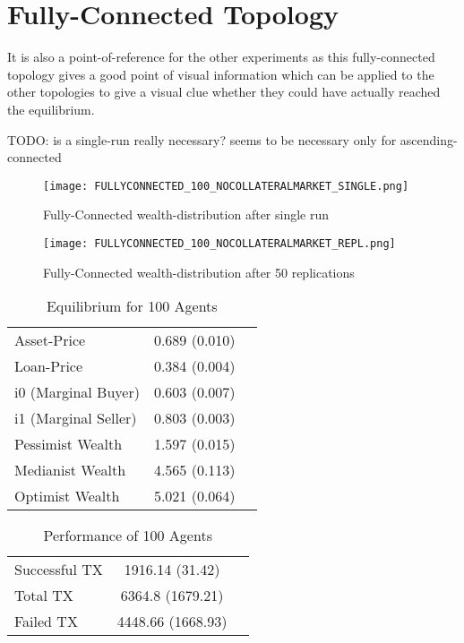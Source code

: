 \documentclass[Bachelorarbeit.tex]{subfiles}
\begin{document}
\section{Fully-Connected Topology}
It is also a point-of-reference for the other experiments as this fully-connected topology gives a good point of visual information which can be applied to the other topologies to give a visual clue whether they could have actually reached the equilibrium.

TODO: is a single-run really necessary? seems to be necessary only for ascending-connected 

\begin{figure}[!htbp]
	\centering
  \texttt{[image: FULLYCONNECTED\_100\_NOCOLLATERALMARKET\_SINGLE.png]}
	\caption{Fully-Connected wealth-distribution after single run}
	\label{fig1}
\end{figure}

\begin{figure}[!htbp]
	\centering
  \texttt{[image: FULLYCONNECTED\_100\_NOCOLLATERALMARKET\_REPL.png]}
	\caption{Fully-Connected wealth-distribution after 50 replications}
	\label{fig1}
\end{figure}

\begin{table}[h]
	\caption{Equilibrium for 100 Agents}
	\centering
	\begin{tabular} { l c r }
		\hline
		Asset-Price & 0.689 (0.010) \\
		Loan-Price & 0.384 (0.004) \\
		i0 (Marginal Buyer) & 0.603 (0.007) \\
		i1 (Marginal Seller) & 0.803 (0.003) \\
		Pessimist Wealth & 1.597 (0.015) \\
		Medianist Wealth & 4.565 (0.113) \\
		Optimist Wealth & 5.021 (0.064) \\
		\hline
	\end{tabular}
\end{table} 

\begin{table}[h]
	\caption{Performance of 100 Agents}
	\centering
	\begin{tabular} { l c r }
		\hline
		Successful TX & 1916.14 (31.42) \\
		Total TX & 6364.8 (1679.21) \\
		Failed TX & 4448.66 (1668.93) \\
		\hline
	\end{tabular}
\end{table}
\end{document}
